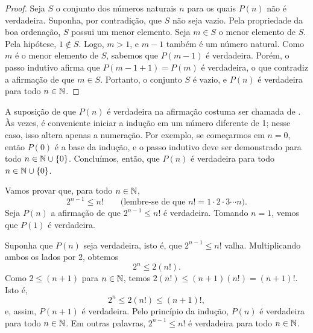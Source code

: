\begin{proof}
Seja $S$ o conjunto dos números naturais $n$ para os quais $P(n)$ não é
verdadeira. Suponha, por contradição, que $S$ não seja vazio.
Pela propriedade da boa ordenação, $S$ possui um menor elemento.
Seja $m \in S$ o menor elemento de $S$. Pela hipótese, $1 \notin S$. Logo,
$m > 1$, e $m-1$ também é um número natural.
Como $m$ é o menor elemento de $S$, sabemos que $P(m-1)$ é verdadeira.
Porém, o passo indutivo afirma que $P(m-1+1) = P(m)$ é verdadeira, o
que contradiz a afirmação de que $m \in S$. Portanto, o conjunto $S$ é vazio, e
$P(n)$ é verdadeira para todo $n \in {\mathbb{N}}$.
\end{proof}

A suposição de que
$P(n)$ é verdadeira na afirmação 
costuma ser chamada de \emph{}.
Às vezes, é conveniente iniciar a indução em um número diferente
de 1; nesse caso, isso altera apenas a numeração.
Por exemplo, se começarmos em $n=0$, então $P(0)$ é a base da
indução, e o passo indutivo deve ser demonstrado para todo
$n \in {\mathbb{N}} \cup \{ 0 \}$.
Concluímos, então, que $P(n)$ é verdadeira para todo
$n \in {\mathbb{N}} \cup \{ 0 \}$.

\begin{example}
Vamos provar que, para todo $n \in {\mathbb{N}}$,
\begin{equation*}
2^{n-1} \leq n! \qquad \text{(lembre-se de que } n! = 1 \cdot 2 \cdot 3 \cdots n\text{)}.
\end{equation*}
Seja $P(n)$ a afirmação de que
$2^{n-1} \leq n!$ é verdadeira.
Tomando $n=1$, vemos que $P(1)$ é verdadeira.

Suponha que $P(n)$ seja verdadeira, isto é, que
$2^{n-1} \leq n!$ valha. Multiplicando ambos os lados por 2, obtemos
\begin{equation*}
2^n \leq 2(n!) .
\end{equation*}
Como $2 \leq (n+1)$ para $n \in {\mathbb{N}}$, temos
$2(n!) \leq (n+1)(n!) = (n+1)!$. Isto é,
\begin{equation*}
2^n \leq 2(n!) \leq  (n+1)!,
\end{equation*}
e, assim, $P(n+1)$ é verdadeira. Pelo princípio da indução,
$P(n)$ é verdadeira para todo $n \in {\mathbb{N}}$. Em outras palavras,
$2^{n-1} \leq n!$ é verdadeira para todo $n \in {\mathbb{N}}$.
\end{example}

